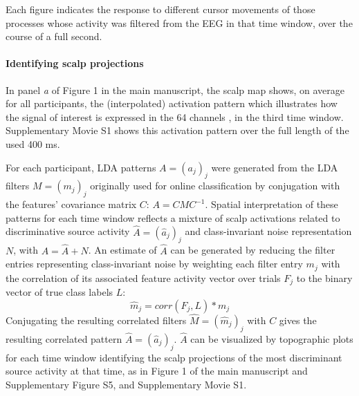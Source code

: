 Each figure indicates the response to different cursor movements of those processes whose activity was filtered from the EEG in that time window, over the course of a full second. 


\paragraph{Identifying scalp projections} In panel \emph{a} of Figure 1 in the main manuscript, the scalp map shows, on average for all participants, the (interpolated) activation pattern which illustrates how the signal of interest is expressed in the 64 channels \cite{haufe2014}, in the third time window. Supplementary Movie S1 shows this activation pattern over the full length of the used 400 ms.

For each participant, LDA patterns $A = (a_{j})_{j}$ were generated from the LDA filters $M = (m_{j})_{j}$ originally used for online classification by conjugation with the features' covariance matrix $C$: $A = CMC^{-1}$. Spatial interpretation of these patterns for each time window reflects a mixture of scalp activations related to discriminative source activity $\widehat{A} = (\widehat{a}_{j})_{j}$ and class-invariant noise representation $N$, with $A = \widehat{A} + N$. An estimate of $\widehat{A}$ can be generated by reducing the filter entries representing class-invariant noise by weighting each filter entry $m_{j}$ with the correlation of its associated feature activity vector over trials $F_j$ to the binary vector of true class labels $L$: $$\widehat{m}_{j} = corr(F_j,L)*m_{j}$$ Conjugating the resulting correlated filters $\widehat{M} = (\widehat{m}_{j})_{j}$ with $C$ gives the resulting correlated pattern $\widehat{A} = (\widehat{a}_j)_j$. $\widehat{A}$ can be visualized by topographic plots for each time window identifying the scalp projections of the most discriminant source activity at that time, as in Figure 1 of the main manuscript and Supplementary Figure S5, and Supplementary Movie S1. \\


